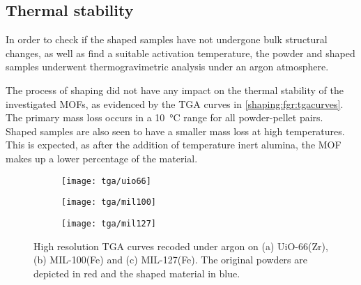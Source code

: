 
\subsection{Thermal stability}

In order to check if the shaped samples have not undergone bulk
structural changes, as well as find a suitable activation temperature,
the powder and shaped samples underwent thermogravimetric analysis
under an argon atmosphere.

The process of shaping did not have any impact on the thermal stability of
the investigated MOFs, as evidenced by the TGA curves in
\autoref{shaping:fgr:tgacurves}. The primary mass loss occurs
in a \SI{10}{\degreeCelsius} range for all powder-pellet pairs.
Shaped samples are also seen to have a smaller mass loss
at high temperatures. This is expected, as after the addition of
temperature inert alumina, the MOF makes up a lower percentage of
the material.

\begin{figure}
	\centering
	\begin{subfigure}{0.85\textwidth}
		\parbox[c]{0.1\linewidth}{\caption{}\label{shaping:fgr:tgauio66}}%
		\parbox[b]{0.7\linewidth}{%
			\texttt{[image: tga/uio66]}%
		}%
	\end{subfigure}%

	\begin{subfigure}{0.85\textwidth}
		\parbox[c]{0.1\linewidth}{\caption{}\label{shaping:fgr:tgamil100}}%
		\parbox[b]{0.7\linewidth}{%
			\texttt{[image: tga/mil100]}%
		}%
	\end{subfigure}%
	
	\begin{subfigure}{0.85\textwidth}
		\parbox[c]{0.1\linewidth}{\caption{}\label{shaping:fgr:tgamil127}}%
		\parbox[b]{0.7\linewidth}{%
			\texttt{[image: tga/mil127]}%
		}%
	\end{subfigure}%

	\caption{High resolution TGA curves recoded under argon
		on (a) UiO-66(Zr), (b) MIL-100(Fe) and (c) MIL-127(Fe). The
		original powders are depicted in red and the shaped material
		in blue.}%
	\label{shaping:fgr:tgacurves}

\end{figure}
